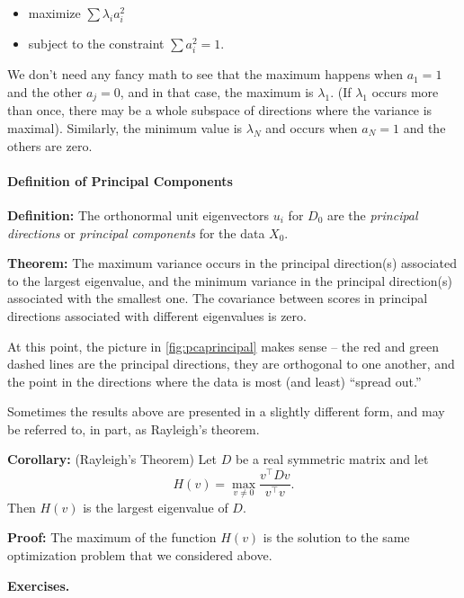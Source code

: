 \documentclass[]{article}
\providecommand{\tightlist}{%
  \setlength{\itemsep}{0pt}\setlength{\parskip}{0pt}}
\let\oldparagraph\paragraph
\renewcommand{\paragraph}[1]{\oldparagraph{#1}\mbox{}}
\begin{document}
\begin{itemize}
\tightlist
\item
  maximize \(\sum \lambda_{i}a_{i}^2\)
\item
  subject to the constraint \(\sum a_{i}^2 = 1\).
\end{itemize}

We don't need any fancy math to see that the maximum happens when
\(a_{1}=1\) and the other \(a_{j}=0\), and in that case, the maximum is
\(\lambda_{1}\). (If \(\lambda_{1}\) occurs more than once, there may be
a whole subspace of directions where the variance is maximal).
Similarly, the minimum value is \(\lambda_{N}\) and occurs when
\(a_{N}=1\) and the others are zero.

\hypertarget{definition-of-principal-components}{%
\paragraph{Definition of Principal
Components}\label{definition-of-principal-components}}

\textbf{Definition:} The orthonormal unit eigenvectors \(u_{i}\) for
\(D_{0}\) are the \emph{principal directions} or \emph{principal
components} for the data \(X_{0}\).

\textbf{Theorem:} The maximum variance occurs in the principal
direction(s) associated to the largest eigenvalue, and the minimum
variance in the principal direction(s) associated with the smallest one.
The covariance between scores in principal directions associated with
different eigenvalues is zero.

At this point, the picture in \cref{fig:pcaprincipal} makes sense -- the
red and green dashed lines are the principal directions, they are
orthogonal to one another, and the point in the directions where the
data is most (and least) ``spread out.''

Sometimes the results above are presented in a slightly different form,
and may be referred to, in part, as Rayleigh's theorem.

\textbf{Corollary:} (Rayleigh's Theorem) Let \(D\) be a real symmetric
matrix and let \[
H(v) = \max_{v\not = 0}\frac{v^{\intercal}Dv}{v^{\intercal}v}.
\] Then \(H(v)\) is the largest eigenvalue of \(D\).

\textbf{Proof:} The maximum of the function \(H(v)\) is the solution to
the same optimization problem that we considered above.

\textbf{Exercises.}
\end{document}
